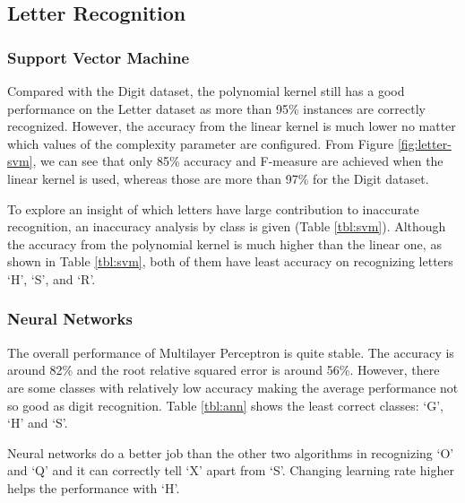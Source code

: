 \documentclass[11pt]{article}
\begin{document}
\subsection{Letter Recognition}
\subsubsection{Support Vector Machine}

Compared with the Digit dataset, the polynomial kernel still has a good performance on the Letter dataset as more than 95\% instances are correctly recognized. However, the accuracy from the linear kernel is much lower no matter which values of the complexity parameter are configured. From Figure \ref{fig:letter-svm}, we can see that only 85\% accuracy and F-measure are achieved when the linear kernel is used, whereas those are more than 97\% for the Digit dataset.

To explore an insight of which letters have large contribution to inaccurate recognition, an inaccuracy analysis by class is given (Table \ref{tbl:svm}). Although the accuracy from the polynomial kernel is much higher than the linear one, as shown in Table \ref{tbl:svm}, both of them have least accuracy on recognizing letters `H', `S', and `R'.


\subsubsection{Neural Networks}
The overall performance of Multilayer Perceptron is quite stable. The accuracy is around 82\% and the root relative squared error is around 56\%. However, there are some classes with relatively low accuracy making the average performance not so good as digit recognition. Table \ref{tbl:ann} shows the least correct classes: `G', `H' and `S'.

Neural networks do a better job than the other two algorithms in recognizing `O' and `Q' and it can correctly tell `X' apart from `S'. Changing learning rate higher helps the performance with `H'.

\end{document}
